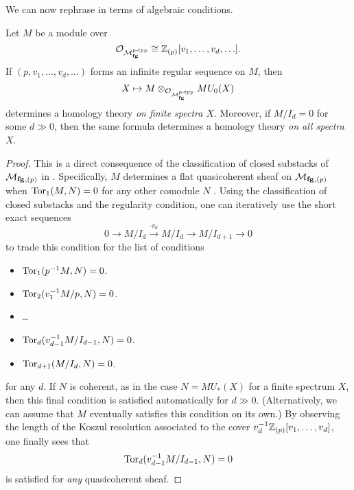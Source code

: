 We can now rephrase  in terms of algebraic conditions.
\begin{theorem}
Let $M$ be a module over \[\mathcal{O}_{\mathcal{M}_{\mathbf{fg}}^{p\text{-}\mathrm{typ}}} \cong \mathbb Z_{(p)}[v_1, \ldots, v_d, \ldots].\]  If $(p, v_1, \ldots, v_d, \ldots)$ forms an infinite regular sequence on $M$, then \[X \mapsto M \otimes_{\mathcal{O}_{\mathcal{M}_{\mathbf{fg}}^{p\text{-}\mathrm{typ}}}} MU_0(X)\] determines a homology theory \emph{on finite spectra $X$}.  Moreover, if $M/I_d = 0$ for some $d \gg 0$, then the same formula determines a homology theory \emph{on all spectra $X$}.
\end{theorem}
\begin{proof}
This is a direct consequence of the classification of closed substacks of $\mathcal{M}_{\mathbf{fg}}{}_{,(p)}$ in .  Specifically, $M$ determines a flat quasicoherent sheaf on $\mathcal{M}_{\mathbf{fg}}{}_{,(p)}$ when $\operatorname{Tor}_1(M, N) = 0$ for any other comodule $N$ .  Using the classification of closed substacks and the regularity condition, one can iteratively use the short exact sequences \[0 \to M / I_d \xrightarrow{\cdot v_d} M / I_d \to M / I_{d+1} \to 0\] to trade this condition for the list of conditions
\begin{itemize}
\item $\operatorname{Tor}_1(p^{-1} M, N) = 0$.
\item $\operatorname{Tor}_2(v_1^{-1} M / p, N) = 0$.
\item \ldots
\item $\operatorname{Tor}_d(v_{d-1}^{-1} M / I_{d-1}, N) = 0$.
\item $\operatorname{Tor}_{d+1}(M / I_d, N) = 0$.
\end{itemize}
for any $d$.  If $N$ is coherent, as in the case $N = MU_*(X)$ for a finite spectrum $X$, then this final condition is satisfied automatically for $d \gg 0$.  (Alternatively, we can assume that $M$ eventually satisfies this condition on its own.)  By observing the length of the Koszul resolution associated to the cover $v_d^{-1} \mathbb Z_{(p)}[v_1, \ldots, v_d]$, one finally sees that \[\operatorname{Tor}_d(v_{d-1}^{-1} M / I_{d-1}, N) = 0\] is satisfied for \emph{any} quasicoherent sheaf.
\end{proof}

